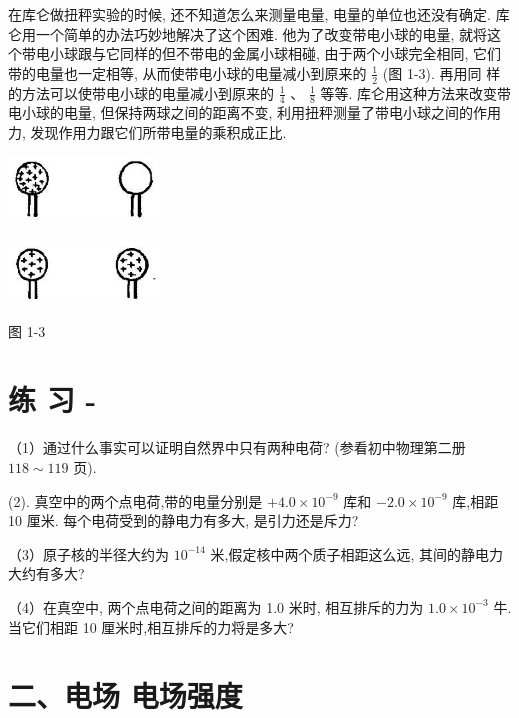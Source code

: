 \documentclass[10pt]{article}
\begin{document}
在库仑做扭秤实验的时候, 还不知道怎么来测量电量, 电量的单位也还没有确定. 库仑用一个简单的办法巧妙地解决了这个困难. 他为了改变带电小球的电量, 就将这个带电小球跟与它同样的但不带电的金属小球相碰, 由于两个小球完全相同, 它们带的电量也一定相等, 从而使带电小球的电量减小到原来的 \(\frac{1}{2}\) (图 1-3). 再用同 样的方法可以使带电小球的电量减小到原来的 \(\frac{1}{4}\) 、 \(\frac{1}{8}\) 等等. 库仑用这种方法来改变带电小球的电量, 但保持两球之间的距离不变, 利用扭秤测量了带电小球之间的作用力, 发现作用力跟它们所带电量的乘积成正比.

\begin{center}
\includegraphics[max width=0.3\textwidth]{images/01913056-1f15-74d8-9184-9aab52c9d66b_18_594411.jpg}
\end{center}

\begin{center}
\includegraphics[max width=0.3\textwidth]{images/01913056-1f15-74d8-9184-9aab52c9d66b_18_498094.jpg}
\end{center}

图 1-3

\section*{练 习 -}

（1）通过什么事实可以证明自然界中只有两种电荷? (参看初中物理第二册 \({118} \sim {119}\) 页).

(2). 真空中的两个点电荷,带的电量分别是 \(+ {4.0} \times {10}^{-9}\) 库和 \(- {2.0} \times {10}^{-9}\) 库,相距 10 厘米. 每个电荷受到的静电力有多大, 是引力还是斥力?

（3）原子核的半径大约为 \({10}^{-{14}}\) 米,假定核中两个质子相距这么远, 其间的静电力大约有多大?

（4）在真空中, 两个点电荷之间的距离为 1.0 米时, 相互排斥的力为 \({1.0} \times {10}^{-3}\) 牛. 当它们相距 10 厘米时,相互排斥的力将是多大?

\section*{二、电场 电场强度}
\end{document}
